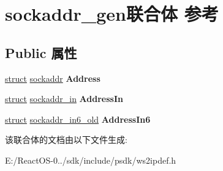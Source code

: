 \hypertarget{unionsockaddr__gen}{}\section{sockaddr\+\_\+gen联合体 参考}
\label{unionsockaddr__gen}
\subsection*{Public 属性}
\begin{DoxyCompactItemize}
\item 
\mbox{\label{unionsockaddr__gen_a2090988fe4dad8183b0b865732d568e4}} 
\hyperlink{interfacestruct}{struct} \hyperlink{structsockaddr}{sockaddr} {\bfseries Address}
\item 
\mbox{\label{unionsockaddr__gen_a422737635d2a09fb04b4f31c28529399}} 
\hyperlink{interfacestruct}{struct} \hyperlink{structsockaddr__in}{sockaddr\+\_\+in} {\bfseries Address\+In}
\item 
\mbox{\label{unionsockaddr__gen_abc9d1e32bbc11135c567adbb41cbe474}} 
\hyperlink{interfacestruct}{struct} \hyperlink{structsockaddr__in6__old}{sockaddr\+\_\+in6\+\_\+old} {\bfseries Address\+In6}
\end{DoxyCompactItemize}


该联合体的文档由以下文件生成\+:\begin{DoxyCompactItemize}
\item 
E\+:/\+React\+O\+S-\/0../sdk/include/psdk/ws2ipdef.\+h\end{DoxyCompactItemize}
